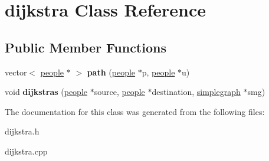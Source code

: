 \hypertarget{classdijkstra}{\section{dijkstra \-Class \-Reference}
\label{classdijkstra}
}
\subsection*{\-Public \-Member \-Functions}
\begin{DoxyCompactItemize}
\item 
\hypertarget{classdijkstra_ab3af29923acfcbafaabc1dbe03c5f9fa}{vector$<$ \hyperlink{classpeople}{people} $\ast$ $>$ {\bfseries path} (\hyperlink{classpeople}{people} $\ast$p, \hyperlink{classpeople}{people} $\ast$u)}\label{classdijkstra_ab3af29923acfcbafaabc1dbe03c5f9fa}

\item 
\hypertarget{classdijkstra_a6c464f660110b21da21c3131eb1d5b73}{void {\bfseries dijkstras} (\hyperlink{classpeople}{people} $\ast$source, \hyperlink{classpeople}{people} $\ast$destination, \hyperlink{classsimplegraph}{simplegraph} $\ast$smg)}\label{classdijkstra_a6c464f660110b21da21c3131eb1d5b73}

\end{DoxyCompactItemize}


\-The documentation for this class was generated from the following files\-:\begin{DoxyCompactItemize}
\item 
dijkstra.\-h\item 
dijkstra.\-cpp\end{DoxyCompactItemize}
